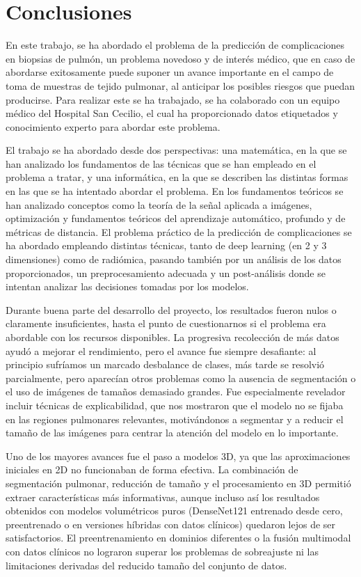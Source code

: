
\chapter{Conclusiones}
En este trabajo, se ha abordado el problema de la predicción de complicaciones en biopsias de pulmón, un problema novedoso y de interés médico, que en caso de abordarse exitosamente puede suponer un avance importante en el campo de toma de muestras de tejido pulmonar, al anticipar los posibles riesgos que puedan producirse. Para realizar este se ha trabajado, se ha colaborado con un equipo médico del Hospital San Cecilio, el cual ha proporcionado datos etiquetados y conocimiento experto para abordar este problema.

El trabajo se ha abordado desde dos perspectivas: una matemática, en la que se han analizado los fundamentos de las técnicas que se han empleado en el problema a tratar, y una informática, en la que se describen las distintas formas en las que se ha intentado abordar el problema. En los fundamentos teóricos se han analizado conceptos como la teoría de la señal aplicada a imágenes, optimización y fundamentos teóricos del aprendizaje automático, profundo y de métricas de distancia. El problema práctico de la predicción de complicaciones se ha abordado empleando distintas técnicas, tanto de deep learning (en 2 y 3 dimensiones) como de radiómica, pasando también por un análisis de los datos proporcionados, un preprocesamiento adecuada y un post-análisis donde se intentan analizar las decisiones tomadas por los modelos.

Durante buena parte del desarrollo del proyecto, los resultados fueron nulos o claramente insuficientes, hasta el punto de cuestionarnos si el problema era abordable con los recursos disponibles. La progresiva recolección de más datos ayudó a mejorar el rendimiento, pero el avance fue siempre desafiante: al principio sufríamos un marcado desbalance de clases, más tarde se resolvió parcialmente, pero aparecían otros problemas como la ausencia de segmentación o el uso de imágenes de tamaños demasiado grandes. Fue especialmente revelador incluir técnicas de explicabilidad, que nos mostraron que el modelo no se fijaba en las regiones pulmonares relevantes, motivándonos a segmentar y a reducir el tamaño de las imágenes para centrar la atención del modelo en lo importante.

Uno de los mayores avances fue el paso a modelos 3D, ya que las aproximaciones iniciales en 2D no funcionaban de forma efectiva. La combinación de segmentación pulmonar, reducción de tamaño y el procesamiento en 3D permitió extraer características más informativas, aunque incluso así los resultados obtenidos con modelos volumétricos puros (DenseNet121 entrenado desde cero, preentrenado o en versiones híbridas con datos clínicos) quedaron lejos de ser satisfactorios. El preentrenamiento en dominios diferentes o la fusión multimodal con datos clínicos no lograron superar los problemas de sobreajuste ni las limitaciones derivadas del reducido tamaño del conjunto de datos.

